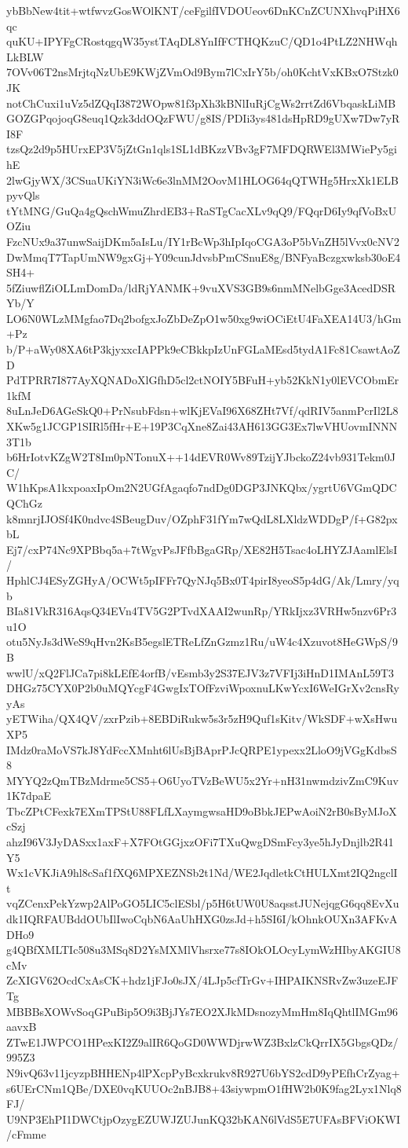 ybBbNew4tit+wtfwvzGosWOlKNT/ceFgilfIVDOUeov6DnKCnZCUNXhvqPiHX6qc
quKU+IPYFgCRostqgqW35ystTAqDL8YnIfFCTHQKzuC/QD1o4PtLZ2NHWqhLkBLW
7OVv06T2nsMrjtqNzUbE9KWjZVmOd9Bym7lCxIrY5b/oh0KchtVxKBxO7Stzk0JK
notChCuxi1uVz5dZQqI3872WOpw81f3pXh3kBNlIuRjCgWs2rrtZd6VbqaskLiMB
GOZGPqojoqG8euq1Qzk3ddOQzFWU/g8IS/PDIi3ys481dsHpRD9gUXw7Dw7yRI8F
tzsQz2d9p5HUrxEP3V5jZtGn1qls1SL1dBKzzVBv3gF7MFDQRWEl3MWiePy5gihE
2lwGjyWX/3CSuaUKiYN3iWc6e3lnMM2OovM1HLOG64qQTWHg5HrxXk1ELBpyvQls
tYtMNG/GuQa4gQschWmuZhrdEB3+RaSTgCacXLv9qQ9/FQqrD6Iy9qfVoBxUOZiu
FzcNUx9a37unwSaijDKm5aIsLu/IY1rBcWp3hIpIqoCGA3oP5bVnZH5lVvx0cNV2
DwMmqT7TapUmNW9gxGj+Y09cunJdvsbPmCSnuE8g/BNFyaBczgxwksb30oE4SH4+
5fZiuwflZiOLLmDomDa/ldRjYANMK+9vuXVS3GB9s6nmMNelbGge3AcedDSRYb/Y
LO6N0WLzMMgfao7Dq2bofgxJoZbDeZpO1w50xg9wiOCiEtU4FaXEA14U3/hGm+Pz
b/P+aWy08XA6tP3kjyxxcIAPPk9eCBkkpIzUnFGLaMEsd5tydA1Fc81CsawtAoZD
PdTPRR7I877AyXQNADoXlGfhD5cl2ctNOIY5BFuH+yb52KkN1y0lEVCObmEr1kfM
8uLnJeD6AGeSkQ0+PrNsubFdsn+wlKjEVaI96X68ZHt7Vf/qdRIV5anmPcrIl2L8
XKw5g1JCGP1SIRl5fHr+E+19P3CqXne8Zai43AH613GG3Ex7lwVHUovmINNN3T1b
b6HrIotvKZgW2T8Im0pNTonuX++14dEVR0Wv89TzijYJbckoZ24vb931Tekm0JC/
W1hKpsA1kxpoaxIpOm2N2UGfAgaqfo7ndDg0DGP3JNKQbx/ygrtU6VGmQDCQChGz
k8mnrjIJOSf4K0ndvc4SBeugDuv/OZphF31fYm7wQdL8LXldzWDDgP/f+G82pxbL
Ej7/cxP74Nc9XPBbq5a+7tWgvPsJFfbBgaGRp/XE82H5Tsac4oLHYZJAamlElsI/
HphlCJ4ESyZGHyA/OCWt5pIFFr7QyNJq5Bx0T4pirI8yeoS5p4dG/Ak/Lmry/yqb
BIa81VkR316AqsQ34EVn4TV5G2PTvdXAAI2wunRp/YRkIjxz3VRHw5nzv6Pr3u1O
otu5NyJs3dWeS9qHvn2KsB5egslETReLfZnGzmz1Ru/uW4c4Xzuvot8HeGWpS/9B
wwlU/xQ2FlJCa7pi8kLEfE4orfB/vEsmb3y2S37EJV3z7VFIj3iHnD1IMAnL59T3
DHGz75CYX0P2b0uMQYcgF4GwgIxTOfFzviWpoxnuLKwYcxI6WeIGrXv2cnsRyyAs
yETWiha/QX4QV/zxrPzib+8EBDiRukw5s3r5zH9Quf1sKitv/WkSDF+wXsHwuXP5
IMdz0raMoVS7kJ8YdFccXMnht6lUsBjBAprPJcQRPE1ypexx2LloO9jVGgKdbsS8
MYYQ2zQmTBzMdrme5CS5+O6UyoTVzBeWU5x2Yr+nH31nwmdzivZmC9Kuv1K7dpaE
TbcZPtCFexk7EXmTPStU88FLfLXaymgwsaHD9oBbkJEPwAoiN2rB0sByMJoXcSzj
ahzI96V3JyDASxx1axF+X7FOtGGjxzOFi7TXuQwgDSmFcy3ye5hJyDnjlb2R41Y5
Wx1cVKJiA9hl8cSaf1fXQ6MPXEZNSb2t1Nd/WE2JqdletkCtHULXmt2IQ2ngclIt
vqZCenxPekYzwp2AlPoGO5LIC5clESbl/p5H6tUW0U8aqsstJUNejqgG6qq8EvXu
dk1IQRFAUBddOUbIlIwoCqbN6AaUhHXG0zsJd+h5SI6I/kOhnkOUXn3AFKvADHo9
g4QBfXMLTIc508u3MSq8D2YsMXMlVhsrxe77s8IOkOLOcyLymWzHIbyAKGIU8cMv
ZcXIGV62OcdCxAsCK+hdz1jFJo0sJX/4LJp5cfTrGv+IHPAIKNSRvZw3uzeEJFTg
MBBBsXOWvSoqGPuBip5O9i3BjJYs7EO2XJkMDsnozyMmHm8IqQhtlIMGm96aavxB
ZTwE1JWPCO1HPexKI2Z9alIR6QoGD0WWDjrwWZ3BxlzCkQrrIX5GbgsQDz/995Z3
N9ivQ63v11jcyzpBHHENp4lPXcpPyBcxkrukv8R927U6bYS2cdD9yPEfhCrZyag+
s6UErCNm1QBe/DXE0vqKUUOc2nBJB8+43siywpmO1fHW2b0K9fag2Lyx1Nlq8FJ/
U9NP3EhPI1DWCtjpOzygEZUWJZUJunKQ32bKAN6lVdS5E7UFAsBFViOKWI/cFmme
